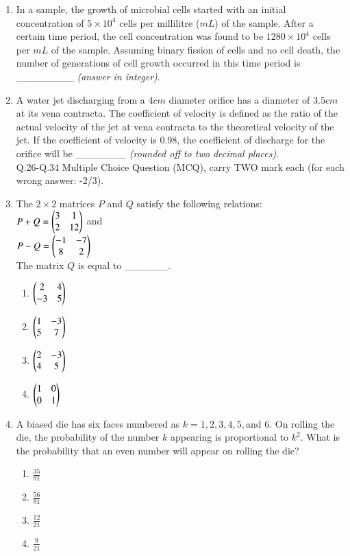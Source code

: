 \documentclass[journal]{IEEEtran}
\begin{document}
\begin{enumerate}[start=1]
\item In a sample, the growth of microbial cells started with an initial concentration of $5\times 10^4$ cells per millilitre ($mL$) of the sample. After a certain time period, the cell concentration was found to be $1280\times 10^4$ cells per $mL$ of the sample. Assuming binary fission of cells and no cell death, the number of generations of cell growth occurred in this time period is \_\_\_\_\_\_\_\_ \textit{(answer in integer)}.
\hfill{}

\item A water jet discharging from a $4 cm$ diameter orifice has a diameter of $3.5 cm$ at its vena contracta. The coefficient of velocity is defined as the ratio of the actual velocity of the jet at vena contracta to the theoretical velocity of the jet. If the coefficient of velocity is 0.98, the coefficient of discharge for the orifice will be \_\_\_\_\_\_\_ \textit{(rounded off to two decimal places)}. \hfill{}\\

Q.26-Q.34 Multiple Choice Question (MCQ), carry TWO mark each (for each wrong answer: -2/3). \\

\item The $2\times2$ matrices $P$ and $Q$ satisfy the following relations:\\
$P + Q = \begin{pmatrix}3 & 1\\2 & 12\end{pmatrix}$ and \\ $P-Q = \begin{pmatrix}-1 & -7\\8 & 2\end{pmatrix}$ \\ The matrix $Q$ is equal to \_\_\_\_\_\_. \hfill{}
\begin{enumerate}
    \item $\begin{pmatrix}2 & 4\\-3 & 5\end{pmatrix}$
    \item $\begin{pmatrix}1 & -3\\5 & 7\end{pmatrix}$
    \item $\begin{pmatrix}2 & -3\\4 & 5\end{pmatrix}$
    \item $\begin{pmatrix}1 & 0\\0 & 1\end{pmatrix}$
\end{enumerate}

\item A biased die has six faces numbered as $k=1,2,3,4,5,\text{and } 6.$ On rolling the die, the probability of the number $k$ appearing is proportional to $k^2$. What is the probability that an even number will appear on rolling the die? \hfill{}
\begin{enumerate}
    \item $\frac{35}{91}$
    \item $\frac{56}{91}$
    \item $\frac{12}{21}$
    \item $\frac{9}{21}$
\end{enumerate}


\end{enumerate}
\end{document}
